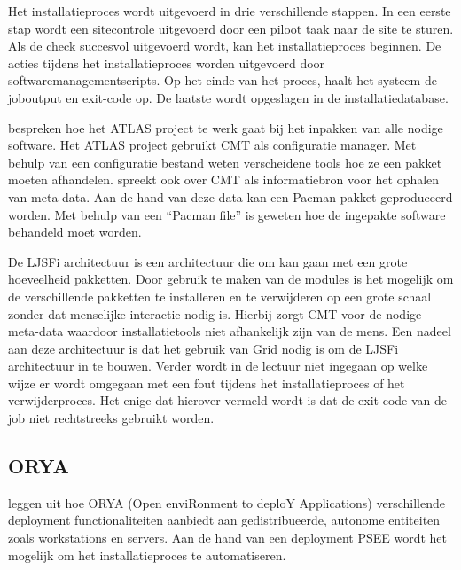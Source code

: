 Het installatieproces wordt uitgevoerd in drie verschillende stappen.
In een eerste stap wordt een sitecontrole uitgevoerd door een piloot taak naar de site te sturen.
Als de check succesvol uitgevoerd wordt, kan het installatieproces beginnen.
De acties tijdens het installatieproces worden uitgevoerd door softwaremanagementscripts.
Op het einde van het proces, haalt het systeem de joboutput en exit-code op.
De laatste wordt opgeslagen in de installatiedatabase.

\citet{Obreshkov2008244} bespreken hoe het ATLAS project te werk gaat bij het inpakken van alle nodige software.
Het ATLAS project gebruikt CMT \citep{cmt} als configuratie manager.
Met behulp van een configuratie bestand weten verscheidene tools hoe ze een pakket moeten afhandelen.
\citet{packAtlas} spreekt ook over CMT als informatiebron voor het ophalen van meta-data.
Aan de hand van deze data kan een Pacman pakket geproduceerd worden.
Met behulp van een ``Pacman file'' is geweten hoe de ingepakte software behandeld moet worden.

De LJSFi architectuur is een architectuur die om kan gaan met een grote hoeveelheid pakketten.
Door gebruik te maken van de modules is het mogelijk om de verschillende pakketten te installeren en te verwijderen op een grote schaal zonder dat menselijke interactie nodig is.
Hierbij zorgt CMT voor de nodige meta-data waardoor installatietools niet afhankelijk zijn van de mens.
Een nadeel aan deze architectuur is dat het gebruik van Grid nodig is om de LJSFi architectuur in te bouwen.
Verder wordt in de lectuur niet ingegaan op welke wijze er wordt omgegaan met een fout tijdens het installatieproces of het verwijderproces.
Het enige dat hierover vermeld wordt is dat de exit-code van de job niet rechtstreeks gebruikt worden.

\subsection{ORYA}\label{sec:ORYA}
\citet{lestideau2003providing} leggen uit hoe ORYA (Open enviRonment to deploY Applications) verschillende deployment functionaliteiten aanbiedt aan gedistribueerde, autonome entiteiten zoals workstations en servers.
Aan de hand van een deployment PSEE \citep{belkhatir2007adele} wordt het mogelijk om het installatieproces te automatiseren.

